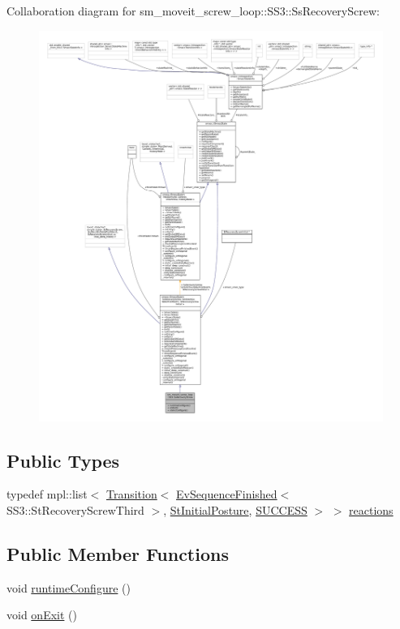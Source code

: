 Collaboration diagram for sm\+\_\+moveit\+\_\+screw\+\_\+loop\+:\+:S\+S3\+:\+:Ss\+Recovery\+Screw\+:
\nopagebreak
\begin{figure}[H]
\begin{center}
\leavevmode
\includegraphics[width=350pt]{structsm__moveit__screw__loop_1_1SS3_1_1SsRecoveryScrew__coll__graph}
\end{center}
\end{figure}
\subsection*{Public Types}
\begin{DoxyCompactItemize}
\item 
typedef mpl\+::list$<$ \hyperlink{classsmacc_1_1Transition}{Transition}$<$ \hyperlink{structsmacc_1_1default__events_1_1EvSequenceFinished}{Ev\+Sequence\+Finished}$<$ S\+S3\+::\+St\+Recovery\+Screw\+Third $>$, \hyperlink{structsm__moveit__screw__loop_1_1StInitialPosture}{St\+Initial\+Posture}, \hyperlink{structsmacc_1_1default__transition__tags_1_1SUCCESS}{S\+U\+C\+C\+E\+SS} $>$ $>$ \hyperlink{structsm__moveit__screw__loop_1_1SS3_1_1SsRecoveryScrew_a33ad06607c3b68b61f6ed335733228e2}{reactions}
\end{DoxyCompactItemize}
\subsection*{Public Member Functions}
\begin{DoxyCompactItemize}
\item 
void \hyperlink{structsm__moveit__screw__loop_1_1SS3_1_1SsRecoveryScrew_a164a9659b1372284331753a90c5b3d9e}{runtime\+Configure} ()
\item 
void \hyperlink{structsm__moveit__screw__loop_1_1SS3_1_1SsRecoveryScrew_af5275b60c505fe63907a14216e1006e1}{on\+Exit} ()
\end{DoxyCompactItemize}
